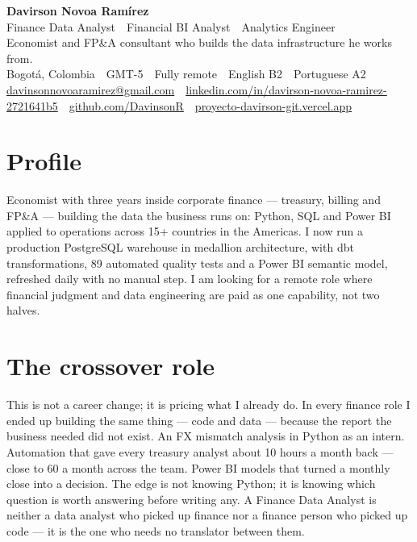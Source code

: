 \documentclass[a4paper,10pt]{article}
\begin{document}
\begin{center}
  {\LARGE\bfseries\color{ink} Davirson Novoa Ramírez}\\[3pt]
  {\large\color{cold} Finance Data Analyst \,\textperiodcentered\, Financial BI Analyst \,\textperiodcentered\, Analytics Engineer}\\[4pt]
  {\small Economist and FP\&A consultant who builds the data infrastructure he works from.}\\[3pt]
  {\small Bogotá, Colombia \,\textperiodcentered\, GMT-5 \,\textperiodcentered\, Fully remote \,\textperiodcentered\, English B2 \,\textperiodcentered\, Portuguese A2}\\[2pt]
  {\small \href{mailto:davinsonnovoaramirez@gmail.com}{davinsonnovoaramirez@gmail.com} \,\textperiodcentered\, \href{https://linkedin.com/in/davirson-novoa-ramirez-2721641b5}{linkedin.com/in/davirson-novoa-ramirez-2721641b5} \,\textperiodcentered\, \href{https://github.com/DavinsonR}{github.com/DavinsonR} \,\textperiodcentered\, \href{https://proyecto-davirson-git.vercel.app/en}{proyecto-davirson-git.vercel.app}}
\end{center}
\vspace{2pt}

\section*{Profile}
Economist with three years inside corporate finance --- treasury, billing and FP\&A --- building the data the business runs on: Python, SQL and Power BI applied to operations across 15+ countries in the Americas. I now run a production PostgreSQL warehouse in medallion architecture, with dbt transformations, 89 automated quality tests and a Power BI semantic model, refreshed daily with no manual step. I am looking for a remote role where financial judgment and data engineering are paid as one capability, not two halves.

\section*{The crossover role}
This is not a career change; it is pricing what I already do. In every finance role I ended up building the same thing --- code and data --- because the report the business needed did not exist. An FX mismatch analysis in Python as an intern. Automation that gave every treasury analyst about 10 hours a month back --- close to 60 a month across the team. Power BI models that turned a monthly close into a decision. The edge is not knowing Python; it is knowing which question is worth answering before writing any. A Finance Data Analyst is neither a data analyst who picked up finance nor a finance person who picked up code --- it is the one who needs no translator between them.
\end{document}
